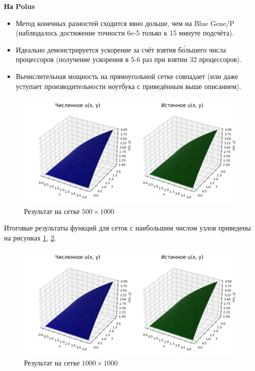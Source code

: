 \documentclass[12pt, fleqn]{article}
\theoremstyle{definition}
\begin{document}
\textbf{На Polus}
\begin{itemize}
    \setlength{\itemsep}{1pt}
  \setlength{\parskip}{0pt}
  \setlength{\parsep}{0pt}
 \item Метод конечных разностей сходится явно дольше, чем на Blue Gene/P (наблюдалось достижение точности 6e-5 только к 15 минуте подсчёта).
 \item Идеально демонстрируется ускорение за счёт взятия б\'{о}льшего числа процессоров (получение ускорения в 5-6 раз при взятии 32 процессоров).
 \item Вычислительная мощность на прямоугольной сетке совпадает (или даже уступает производительности ноутбука с приведённым выше описанием).
\end{itemize}
\begin{figure}[ht!]
        \centering
        \includegraphics[width=\textwidth]{u_local_4_500_1000.png} 
        \caption{Результат на сетке $500 \times 1000$}\label{fig:500_1000}
\end{figure}
Итоговые результаты функций для сеток с наибольшим числом узлов приведены на рисунках \ref{fig:500_1000}, \ref{fig:1000_1000}.
\begin{figure}[ht!]
        \centering
        \includegraphics[width=\textwidth]{u_local_4_1000_1000.png} 
        \caption{Результат на сетке $1000 \times 1000$}
        \label{fig:1000_1000}
\end{figure}
\end{document}
